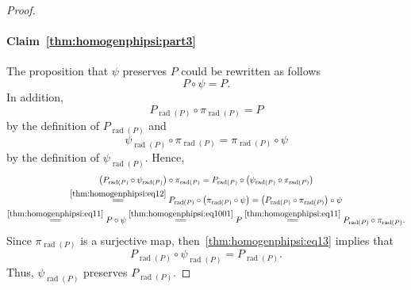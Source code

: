 \documentclass{elsarticle}
\DeclareMathOperator{\rad}{rad}
\theoremstyle{definition}
\numberwithin{equation}{section}
\begin{document}
\begin{proof}
\paragraph{Claim~\ref{thm:homogenphipsi:part3}}%
The proposition that $\psi$ preserves $P$ could be rewritten as follows
\begin{equation}\label{thm:homogenphipsi:eq1001}
P \circ \psi = P.
\end{equation}
In addition,
\begin{equation}\label{thm:homogenphipsi:eq11}
P_{\rad(P)} \circ  \pi_{\rad(P)} = P
\end{equation}
by the definition of $P_{\rad(P)}$ and 
\begin{equation}\label{thm:homogenphipsi:eq12}
\psi_{\rad(P)} \circ \pi_{\rad(P)} = \pi_{\rad(P)} \circ \psi
\end{equation}
by the definition of $\psi_{\rad(P)}$. Hence,
\begin{multline}\label{thm:homogenphipsi:eq13}
\left(P_{\rad(P)} \circ  \psi_{\rad(P)}\right) \circ \pi_{\rad(P)} = P_{\rad(P)} \circ  \left(\psi_{\rad(P)}\circ \pi_{\rad(P)}\right)\\
\overset{\eqref{thm:homogenphipsi:eq12}}{=\joinrel=} P_{\rad(P)} \circ  \left(\pi_{\rad(P)} \circ \psi \right)
= \left(P_{\rad(P)} \circ  \pi_{\rad(P)} \right) \circ \psi\\ \overset{\eqref{thm:homogenphipsi:eq11}}{=\joinrel=} P \circ \psi \overset{\eqref{thm:homogenphipsi:eq1001}}{=\joinrel=} P \overset{\eqref{thm:homogenphipsi:eq11}}{=\joinrel=} P_{\rad(P)} \circ  \pi_{\rad(P)}.
\end{multline}
Since $\pi_{\rad(P)}$ is a surjective map, then~\eqref{thm:homogenphipsi:eq13} implies that
\[
P_{\rad(P)} \circ  \psi_{\rad(P)} = P_{\rad(P)}.
\]
Thus, $\psi_{\rad(P)}$ preserves $P_{\rad(P)}$.



\end{proof}
\end{document}
